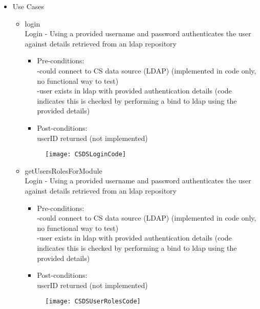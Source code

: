 \begin {itemize}
\item Use Cases
\begin {itemize}
\item {login}\\
Login - Using a provided username and password authenticates the user against details retrieved from an ldap repository
\begin {itemize}
\item Pre-conditions:\\
-could connect to CS data source (LDAP) (implemented in code only, no functional way to test)\\
        -user exists in ldap with provided authentication details (code indicates this is checked by performing a bind to ldap using the provided details)\\
\item Post-conditions:\\
userID returned (not implemented)  
\end {itemize}

\begin{figure}[h!]
  \centering
    \texttt{[image: CSDSLoginCode]} 
\end{figure}


\end {itemize}

\begin {itemize}
\item {getUsersRolesForModule}\\
Login - Using a provided username and password authenticates the user against details retrieved from an ldap repository\\
\begin {itemize}
\item Pre-conditions:\\
-could connect to CS data source (LDAP) (implemented in code only, no functional way to test)\\
        -user exists in ldap with provided authentication details (code indicates this is checked by performing a bind to ldap using the provided details)\\
\item Post-conditions:\\
userID returned (not implemented)  
\end {itemize}
	\begin{figure}[h!]
  \centering
    \texttt{[image: CSDSUserRolesCode]} 
\end{figure}
\end {itemize}


\end{itemize}
